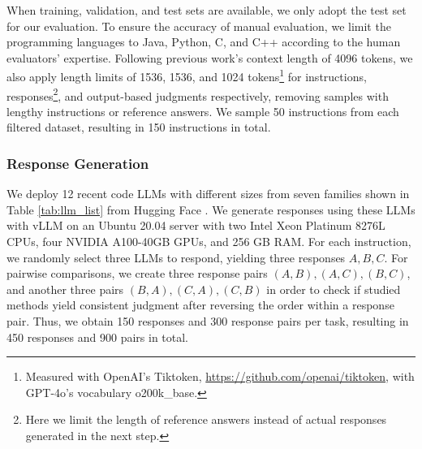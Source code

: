 When training, validation, and test sets are available, we only adopt the test set for our evaluation. To ensure the accuracy of manual evaluation, we limit the programming languages to Java, Python, C, and C++ according to the human evaluators' expertise. Following previous work's \cite{DBLP:journals/corr/abs-2310-03304,DBLP:journals/corr/abs-2405-01535} context length of 4096 tokens, we also apply length limits of 1536, 1536, and 1024 tokens\footnote{Measured with OpenAI's Tiktoken, \url{https://github.com/openai/tiktoken}, with GPT-4o's vocabulary o200k\_base.} for instructions, responses\footnote{Here we limit the length of reference answers instead of actual responses generated in the next step.}, and output-based judgments respectively, removing samples with lengthy instructions or reference answers. We sample 50 instructions from each filtered dataset, resulting in 150 instructions in total.

\subsubsection{Response Generation}
We deploy 12 recent code LLMs with different sizes from seven families shown in Table \ref{tab:llm_list} from Hugging Face \cite{DBLP:journals/corr/abs-1910-03771}. We generate responses using these LLMs with vLLM \cite{DBLP:conf/sosp/KwonLZ0ZY0ZS23} on an Ubuntu 20.04 server with two Intel Xeon Platinum 8276L CPUs, four NVIDIA A100-40GB GPUs, and 256 GB RAM. For each instruction, we randomly select three LLMs to respond, yielding three responses \(A,B,C\). For pairwise comparisons, we create three response pairs \((A,B), (A,C),(B,C)\), and another three pairs \((B,A),(C,A),(C,B)\) in order to check if studied methods yield consistent judgment after reversing the order within a response pair. Thus, we obtain 150 responses and 300 response pairs per task, resulting in 450 responses and 900 pairs in total. 

